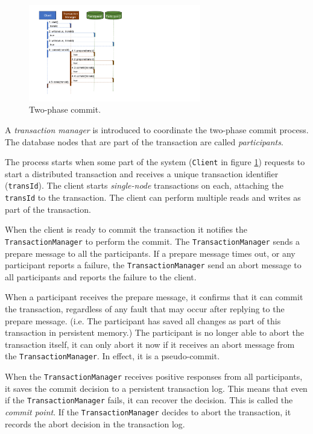 \begin{figure}[h!]
    \centering
    \includegraphics[trim=55 70 420 30,clip,width=0.67\textwidth]{diagrams/2phase-commit-seq.png}
    \caption{Two-phase commit.}
    \label{fig:2pc-seq}
\end{figure}

A \emph{transaction manager} is introduced to coordinate the two-phase commit process.
The database nodes that are part of the transaction are called \emph{participants}.

The process starts when some part of the system (\texttt{Client} in figure \ref{fig:2pc-seq})
requests to start a distributed transaction and receives a unique transaction identifier (\texttt{transId}).
The client starts \emph{single-node} transactions on each, attaching the \texttt{transId} to the transaction.
The client can perform multiple reads and writes as part of the transaction.

When the client is ready to commit the transaction it notifies the \texttt{TransactionManager} to perform the commit.
The \texttt{TransactionManager} sends a prepare message to all the participants.
If a prepare message times out, or any participant reports a failure,
the \texttt{TransactionManager} send an abort message to all participants and reports the failure to the client.

When a participant receives the prepare message, it confirms that it can commit the transaction,
regardless of any fault that may occur after replying to the prepare message.
(i.e. The participant has saved all changes as part of this transaction in persistent memory.)
The participant is no longer able to abort the transaction itself,
it can only abort it now if it receives an abort message from the \texttt{TransactionManager}.
In effect, it is a pseudo-commit.

When the \texttt{TransactionManager} receives positive responses from all participants,
it saves the commit decision to a persistent transaction log.
This means that even if the \texttt{TransactionManager} fails, it can recover the decision.
This is called the \emph{commit point}.
If the \texttt{TransactionManager} decides to abort the transaction,
it records the abort decision in the transaction log.

